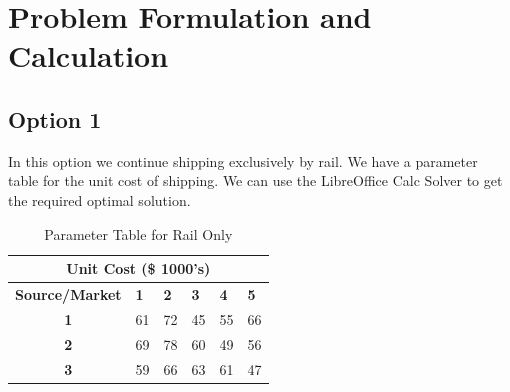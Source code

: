 \documentclass[12pt]{article}
\numberwithin{equation}{section}
\numberwithin{table}{section}
\numberwithin{figure}{section}
\begin{document}
\section{Problem Formulation and Calculation}
\subsection{Option 1}
In this option we continue shipping exclusively by rail. We have a parameter table for the unit cost of shipping. We can use the LibreOffice Calc Solver to get the required optimal solution.

\begin{table}[h!]
\centering
\caption{Parameter Table for Rail Only}
\label{param_rail_only}
\begin{tabular}{|c|c|c|c|c|c|}
\hline
\multicolumn{6}{|c|}{\textbf{Unit Cost (\$ 1000's)}}                                                                                                                                                                   \\ \hline
\multicolumn{1}{|l|}{\textbf{Source/Market}} & \multicolumn{1}{l|}{\textbf{1}} & \multicolumn{1}{l|}{\textbf{2}} & \multicolumn{1}{l|}{\textbf{3}} & \multicolumn{1}{l|}{\textbf{4}} & \multicolumn{1}{l|}{\textbf{5}} \\ \hline
\textbf{1}                                   & 61                              & 72                              & 45                              & 55                              & 66                              \\ \hline
\textbf{2}                                   & 69                              & 78                              & 60                              & 49                              & 56                              \\ \hline
\textbf{3}                                   & 59                              & 66                              & 63                              & 61                              & 47                              \\ \hline
\end{tabular}
\end{table}
\end{document}
